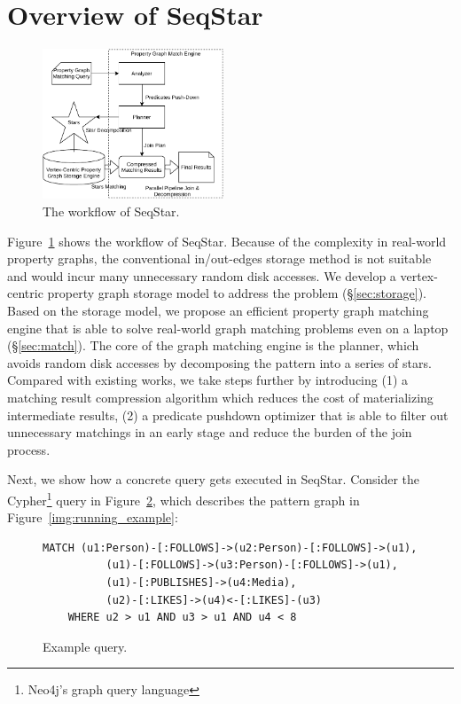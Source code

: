 \section{Overview of SeqStar}\label{sec:framework}
\begin{figure}[ht]
  \centering
  \includegraphics[width=0.48\textwidth]{img/architecture.pdf}
  \caption{The workflow of SeqStar.}\label{img:architecture}
\end{figure}
Figure~\ref{img:architecture} shows the workflow of SeqStar.
Because of the complexity in real-world property graphs,
the conventional in/out-edges storage method is not suitable and would incur many unnecessary random disk accesses.
We develop a vertex-centric property graph storage model to address the problem (\S\ref{sec:storage}).
Based on the storage model,
we propose an efficient property graph matching engine that is able to solve real-world graph matching problems even on a laptop (\S\ref{sec:match}).
The core of the graph matching engine is the planner, which avoids random disk accesses by decomposing the pattern into a series of stars.
Compared with existing works, we take steps further by introducing
(1) a matching result compression algorithm which reduces the cost of materializing intermediate results,
(2) a predicate pushdown optimizer that is able to filter out unnecessary matchings in an early stage and reduce the burden of the join process.

Next, we show how a concrete query gets executed in SeqStar.
Consider the Cypher\footnote{Neo4j's graph query language} query in Figure~\ref{img:cypher_query},
which describes the pattern graph in Figure~\ref{img:running_example}:

\begin{figure}[ht]
  \begin{Verbatim}[fontsize=\small]
    MATCH (u1:Person)-[:FOLLOWS]->(u2:Person)-[:FOLLOWS]->(u1),
          (u1)-[:FOLLOWS]->(u3:Person)-[:FOLLOWS]->(u1),
          (u1)-[:PUBLISHES]->(u4:Media),
          (u2)-[:LIKES]->(u4)<-[:LIKES]-(u3)
    WHERE u2 > u1 AND u3 > u1 AND u4 < 8
  \end{Verbatim}
  \caption{Example query.}\label{img:cypher_query}
\end{figure}

